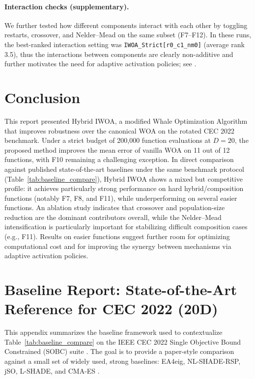 \documentclass[conference]{IEEEtran}
\begin{document}
\paragraph{Interaction checks (supplementary).}
We further tested how different components interact with each other by toggling restarts, crossover, and Nelder--Mead on the same subset (F7--F12). In these runs, the best-ranked interaction setting was \texttt{IWOA\_Strict[r0\_c1\_nm0]} (average rank 3.5), thus the interactions between components are clearly non-additive and further motivates the need for adaptive activation policies; see .

\section{Conclusion}
\label{sec:conclusion}

This report presented Hybrid IWOA, a modified Whale Optimization Algorithm that improves robustness over the canonical WOA on the rotated CEC 2022 benchmark. Under a strict budget of 200{,}000 function evaluations at $D=20$, the proposed method improves the mean error of vanilla WOA on 11 out of 12 functions, with F10 remaining a challenging exception. In direct comparison against published state-of-the-art baselines under the same benchmark protocol (Table~\ref{tab:baseline_compare}), Hybrid IWOA shows a mixed but competitive profile: it achieves particularly strong performance on hard hybrid/composition functions (notably F7, F8, and F11), while underperforming on several easier functions. An ablation study indicates that crossover and population-size reduction are the dominant contributors overall, while the Nelder--Mead intensification is particularly important for stabilizing difficult composition cases (e.g., F11). Results on easier functions suggest further room for optimizing computational cost and for improving the synergy between mechanisms via adaptive activation policies.

\appendices
\section{Baseline Report: State-of-the-Art Reference for CEC 2022 (20D)}
\label{app:baseline_report}

This appendix summarizes the baseline framework used to contextualize Table~\ref{tab:baseline_compare} on the IEEE CEC 2022 Single Objective Bound Constrained (SOBC) suite \cite{Suganthan2022}. The goal is to provide a paper-style comparison against a small set of widely used, strong baselines: EA4eig, NL-SHADE-RSP, jSO, L-SHADE, and CMA-ES \cite{Biedrzycki2022,BiedrzyckiAnalysis,Stanovov2022,Comparative2022}.
\end{document}
